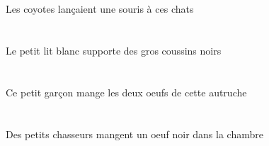 \begin{exe}
\DEFPlErgP{}   \coyoteCPlErgP{}    \DEMPlDatP{}   \chatDPlDatP{}   \INDSgAbsP{}   \sourisBSgAbsP{}  \lancerVdPstBSgP{}\\
\DEFPlErgG{}   \coyoteCPlErgG{}    \DEMPlDatG{}   \chatDPlDatG{}   \INDSgAbsG{}   \sourisBSgAbsG{}  \lancerVdPstBSgG{}\\
Les coyotes lançaient une souris à ces chats
\ex\glll
\DEFSgErg{}   \petitDSg{}   \blancDSg{}   \litDSgErg{}   \INDPlAbs{}   \grosBPl{}   \noirBPl{}   \coussinBPlAbs{}  \supporterVtPrsBPl{}\\
\DEFSgErgP{}   \petitDSgP{}   \blancDSgP{}   \litDSgErgP{}   \INDPlAbsP{}   \grosBPlP{}   \noirBPlP{}   \coussinBPlAbsP{}  \supporterVtPrsBPlP{}\\
\DEFSgErgG{}   \petitDSgG{}   \blancDSgG{}   \litDSgErgG{}   \INDPlAbsG{}   \grosBPlG{}   \noirBPlG{}   \coussinBPlAbsG{}  \supporterVtPrsBPlG{}\\
Le petit lit blanc supporte des gros coussins noirs
\ex\glll
\DEMSgErg{}   \petitDSg{}   \garconDSgErg{}   \DEFDuAbs{}    \DEMSgObl{}   \autrucheBSgObl{}   \DE{}   \oeufCDuAbs{}  \mangerVtPrsCDu{}\\
\DEMSgErgP{}   \petitDSgP{}   \garconDSgErgP{}   \DEFDuAbsP{}    \DEMSgOblP{}   \autrucheBSgOblP{}   \DEP{}   \oeufCDuAbsP{}  \mangerVtPrsCDuP{}\\
\DEMSgErgG{}   \petitDSgG{}   \garconDSgErgG{}   \DEFDuAbsG{}    \DEMSgOblG{}   \autrucheBSgOblG{}   \DEG{}   \oeufCDuAbsG{}  \mangerVtPrsCDuG{}\\
Ce petit garçon mange les deux oeufs de cette autruche
\ex\glll
\DEFSgObl{}   \chambreBSgObl{}   \DANS{}   \INDPlErg{}   \petitCPl{}   \chasseurCPlErg{}   \INDSgAbs{}   \noirCSg{}   \oeufCSgAbs{}  \mangerVtPrsCSg{}\\
\DEFSgOblP{}   \chambreBSgOblP{}   \DANSP{}   \INDPlErgP{}   \petitCPlP{}   \chasseurCPlErgP{}   \INDSgAbsP{}   \noirCSgP{}   \oeufCSgAbsP{}  \mangerVtPrsCSgP{}\\
\DEFSgOblG{}   \chambreBSgOblG{}   \DANSG{}   \INDPlErgG{}   \petitCPlG{}   \chasseurCPlErgG{}   \INDSgAbsG{}   \noirCSgG{}   \oeufCSgAbsG{}  \mangerVtPrsCSgG{}\\
Des petits chasseurs mangent un oeuf noir dans la chambre
\ex\glll
\DEMDuObl{}   \maisonDDuObl{}   \DEVANT{}   \INDDuErg{}   \autrucheBDuErg{}   \INDPlAbs{}   \fruitAPlAbs{}  \mangerVtPstAPl{}\\
\DEMDuOblP{}   \maisonDDuOblP{}   \DEVANTP{}   \INDDuErgP{}   \autrucheBDuErgP{}   \INDPlAbsP{}   \fruitAPlAbsP{}  \mangerVtPstAPlP{}\\

\end{exe}
